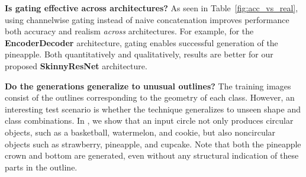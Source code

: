 \vspace{2mm} \noindent \textbf{Is gating effective across architectures?} 
As seen in Table~\ref{fig:acc_vs_real}, using channelwise gating instead of naive concatenation improves performance both accuracy and realism \textit{across} architectures. For example, for the \textbf{EncoderDecoder} architecture, gating enables successful generation of the pineapple.
Both quantitatively and qualitatively, results are better for our proposed \textbf{SkinnyResNet} architecture.


\vspace{2mm} \noindent \textbf{Do the generations generalize to unusual outlines?} The training images consist of the outlines corresponding to the geometry of each class. However, an interesting test scenario is whether the technique generalizes to unseen shape and class combinations. In , we show that an input circle not only produces circular objects, such as a basketball, watermelon, and cookie, but also noncircular objects such as strawberry, pineapple, and cupcake. Note that both the pineapple crown and bottom are generated, even without any structural indication of these parts in the outline.




